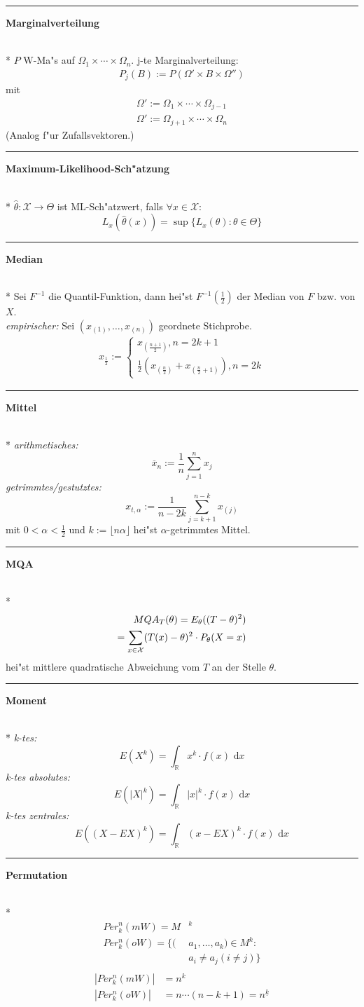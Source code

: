 \documentclass{article}
\newcommand{\hh}[1]{{\vspace{1pt}\hrule\vspace{1pt} \noindent\textbf{#1}}\\*}
\newcommand{\hhh}[1]{{\vspace{1pt}\noindent\emph{#1:}}}
\begin{document}
\begin{multicols}{4}
\hh{Marginalverteilung}
$P$ W-Ma"s auf $\Omega_1\times\cdots\times\Omega_n$. j-te Marginalverteilung:
\begin{align*}
P_j(B):=P(\Omega'\times B\times\Omega'') %
\end{align*}
mit
\begin{align*}
\Omega':=\Omega_1\times\cdots\times\Omega_{j-1}\\
\Omega':=\Omega_{j+1}\times\cdots\times\Omega_{n}
\end{align*}
(Analog f"ur Zufallsvektoren.)

\hh{Maximum-Likelihood-Sch"atzung}
$\hat\theta:\mathcal{X}\to\Theta$ ist ML-Sch"atzwert, falls
$\forall x\in\mathcal{X}:$ 
\[L_x(\hat\theta(x))=\sup\{L_x(\theta):\theta\in\Theta\}\]

\hh{Median}
Sei $F^{-1}$ die Quantil-Funktion, dann hei"st $F^{-1}(\frac12)$ der Median von $F$ bzw. von $X$. \\
\hhh{empirischer}
Sei $(x_{(1)},\ldots,x_{(n)})$ geordnete Stichprobe.
\begin{align*}
x_{\frac12}:=
\begin{cases}
x_{(\frac{n+1}2)}, n=2k+1\\
\frac12(x_{(\frac n2)}+x_{(\frac n2 +1)}),n=2k
\end{cases}
\end{align*}

\hh{Mittel}
\hhh{arithmetisches}
\[\overline x_n:= \frac1n \sum_{j=1}^n x_j\]
\hhh{getrimmtes/gestutztes}
\[x_{t,\alpha}:=\frac1{n-2k}\sum_{j=k+1}^{n-k}x_{(j)}\]
mit $0<\alpha<\frac12$ und $k:=\lfloor n\alpha\rfloor$ hei"st $\alpha$-getrimmtes Mittel.

\hh{MQA}
\begin{align*}
MQA_T(\theta)=E_\theta((T-\theta)^2)\\
=\sum_{x\in\cal{X}}(T(x)-\theta)^2\cdot P_\theta(X=x)
\end{align*}
hei"st mittlere quadratische Abweichung vom $T$ an der Stelle $\theta$.

\hh{Moment}
\hhh{k-tes} \[E(X^k)=\int_\mathbb{R} x^k\cdot f(x)\text{ d}x\]
\hhh{k-tes absolutes} \[E(|X|^k)=\int_\mathbb{R} |x|^k\cdot f(x)\text{ d}x\]
\hhh{k-tes zentrales} \[E((X-EX)^k)=\int_\mathbb{R} (x-EX)^k\cdot f(x)\text{ d}x\]

\hh{Permutation}
\begin{align*}
Per_k^n(mW)=M&^k\\
Per_k^n(oW)=\{(&a_1,\ldots,a_k)\in M^k: \\&a_i\ne a_j (i\ne j)\}\\
\end{align*}
\begin{align*}
|Per_k^n(mW)|&=n^k\\
|Per_k^n(oW)|&=n\cdots(n-k+1)=n^{\underline k}\\
\end{align*}


\end{multicols}
\end{document}
